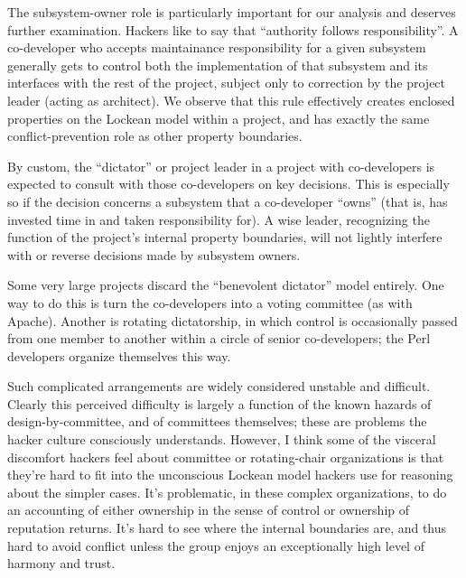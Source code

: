 The subsystem-owner role is particularly important for our analysis and deserves
further examination.  Hackers like to say that ``authority follows
responsibility''.  A co-developer who accepts maintainance responsibility for a
given subsystem generally gets to control both the implementation of that
subsystem and its interfaces with the rest of the project, subject only to
correction by the project leader (acting as architect).  We observe that this
rule effectively creates enclosed properties on the Lockean model within a
project, and has exactly the same conflict-prevention role as other property
boundaries.

By custom, the ``dictator'' or project leader in a project with co-developers is
expected to consult with those co-developers on key decisions.  This is
especially so if the decision concerns a subsystem that a co-developer ``owns''
(that is, has invested time in and taken responsibility for).  A wise leader,
recognizing the function of the project's internal property boundaries, will not
lightly interfere with or reverse decisions made by subsystem owners.

Some very large projects discard the ``benevolent dictator'' model entirely.
One way to do this is turn the co-developers into a voting committee (as with
Apache).  Another is rotating dictatorship, in which control is occasionally
passed from one member to another within a circle of senior co-developers; the
Perl developers organize themselves this way.

Such complicated arrangements are widely considered unstable and difficult.
Clearly this perceived difficulty is largely a function of the known hazards of
design-by-committee, and of committees themselves; these are problems the hacker
culture consciously understands.  However, I think some of the visceral
discomfort hackers feel about committee or rotating-chair organizations is that
they're hard to fit into the unconscious Lockean model hackers use for reasoning
about the simpler cases.  It's problematic, in these complex organizations, to
do an accounting of either ownership in the sense of control or ownership of
reputation returns.  It's hard to see where the internal boundaries are, and
thus hard to avoid conflict unless the group enjoys an exceptionally high level
of harmony and trust.
